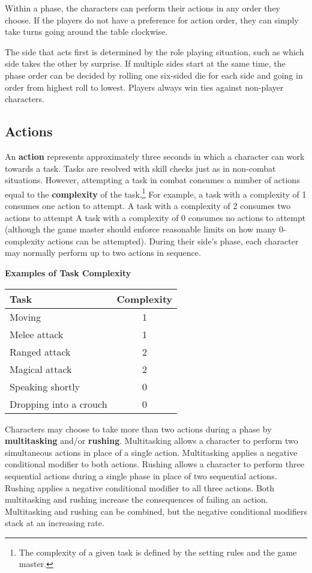 \documentclass[11pt]{article}
\begin{document}
Within a phase, the characters can perform their actions in any order they choose.
If the players do not have a preference for action order, they can simply take turns going around the table clockwise.

The side that acts first is determined by the role playing situation, such as which side takes the other by surprise.
If multiple sides start at the same time, the phase order can be decided by rolling one six-sided die for each side and going in order from highest roll to lowest.
Players always win ties against non-player characters.

\subsection{Actions}
An \textbf{action} represents approximately three seconds in which a character can work towards a task. 
Tasks are resolved with skill checks just as in non-combat situations.
However, attempting a task in combat consumes a number of actions equal to the \textbf{complexity} of the task.\footnote{The complexity of a given task is defined by the setting rules and the game master.}
For example, a task with a complexity of 1 consumes one action to attempt.
A task with a complexity of 2 consumes two actions to attempt
A task with a complexity of 0 consumes no actions to attempt (although the game master should enforce reasonable limits on how many 0-complexity actions can be attempted).
During their side's phase, each character may normally perform up to two actions in sequence.

\begin{center}
	\textbf{Examples of Task Complexity} \\
	\begin{tabular}{lc}
		Task                   & Complexity \\
		\hline
		Moving                 & 1          \\
		Melee attack           & 1          \\
		Ranged attack          & 2          \\
		Magical attack         & 2          \\
		Speaking shortly       & 0          \\
		Dropping into a crouch & 0          \\
	\end{tabular}
\end{center}

Characters may choose to take more than two actions during a phase by \textbf{multitasking} and/or \textbf{rushing}.
Multitasking allows a character to perform two simultaneous actions in place of a single action.
Multitasking applies a negative conditional modifier to both actions.
Rushing allows a character to perform three sequential actions during a single phase in place of two sequential actions. Rushing applies a negative conditional modifier to all three actions.
Both multitasking and rushing increase the consequences of failing an action.
Multitasking and rushing can be combined, but the negative conditional modifiers stack at an increasing rate.
\end{document}

